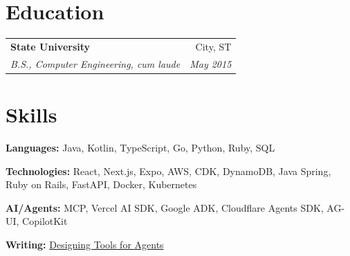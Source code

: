 \documentclass[letterpaper,10pt]{article}
\makeatletter
\newcommand{\resumeEntry}[4]{%
  \begin{tabular*}{\linewidth}{@{}l@{\extracolsep{\fill}}r@{}}
    \textbf{#1} & #2 \\
    \textit{\small #3} & \textit{\small #4} \\
  \end{tabular*}%
}
\makeatother
\begin{document}
\section{Education}
\begin{description}
  \item
        \resumeEntry{State University}{City, ST}{B.S., Computer Engineering, cum laude}{May 2015}
\end{description}


\section{Skills}
\begin{description}
  \item \textbf{Languages:} Java, Kotlin, TypeScript, Go, Python, Ruby, SQL
  \item \textbf{Technologies:} React, Next.js, Expo, AWS, CDK, DynamoDB, Java Spring, Ruby on Rails, FastAPI, Docker, Kubernetes
  \item \textbf{AI/Agents:} MCP, Vercel AI SDK, Google ADK, Cloudflare Agents SDK, AG-UI, CopilotKit
  \item \textbf{Writing:} \href{https://janedoe.example.com/blog/agent-tools}{Designing Tools for Agents}\end{description}
\end{document}
